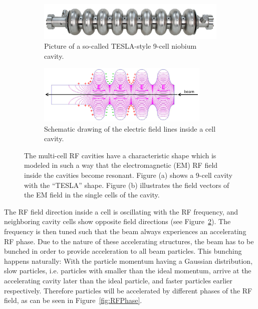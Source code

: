 \begin{figure}
\begin{subfigure}[b]{0.49\textwidth}
\centering
 \includegraphics[width=\textwidth]{Figures/Tesla_Cavity.jpg}
\caption[Tesla-style 9-cell cavity]{Picture of a so-called TESLA-style 9-cell niobium cavity.~\cite[p. 15]{TDR31}}
\label{fig:Tesla_Cavity}
\end{subfigure}\hfill
\begin{subfigure}[b]{0.49\textwidth}
\centering
 \includegraphics[width=0.9\textwidth]{Figures/Cavity.png}
\caption[Electric field in a cell cavity]{Schematic drawing of the electric field lines inside a cell cavity.~\cite[p. 47]{Desy_SummerStudent_Lecture}}
\label{fig:Cavity}
\end{subfigure}
\caption[RF cavities]{The multi-cell RF cavities have a characteristic shape which is modeled in such a way that the electromagnetic (EM) RF field inside the cavities become resonant. Figure (a) shows a 9-cell cavity with the ``TESLA'' shape. Figure (b) illustrates the field vectors of the EM field in the single cells of the cavity.}
\label{fig:Cavities}
\end{figure}
The RF field direction inside a cell is oscillating with the RF frequency, and neighboring cavity cells show opposite field directions (see Figure~\ref{fig:Cavity}).
The frequency is then tuned such that the beam always experiences an accelerating RF phase. 
Due to the nature of these accelerating structures, the beam has to be bunched in order to provide acceleration to all beam particles.
This bunching happens naturally:
With the particle momentum having a Gaussian distribution, slow particles, i.e. particles with smaller than the ideal momentum, arrive at the accelerating cavity later than the ideal particle, and faster particles earlier respectively.
Therefore particles will be accelerated by different phases of the RF field, as can be seen in Figure~\ref{fig:RFPhase}.
